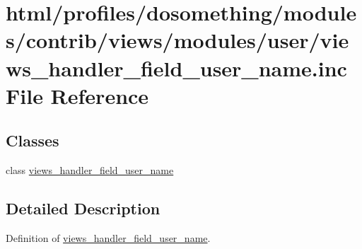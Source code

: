 \hypertarget{views__handler__field__user__name_8inc}{
\section{html/profiles/dosomething/modules/contrib/views/modules/user/views\_\-handler\_\-field\_\-user\_\-name.inc File Reference}
\label{views__handler__field__user__name_8inc}
}
\subsection*{Classes}
\begin{DoxyCompactItemize}
\item 
class \hyperlink{classviews__handler__field__user__name}{views\_\-handler\_\-field\_\-user\_\-name}
\end{DoxyCompactItemize}


\subsection{Detailed Description}
Definition of \hyperlink{classviews__handler__field__user__name}{views\_\-handler\_\-field\_\-user\_\-name}. 